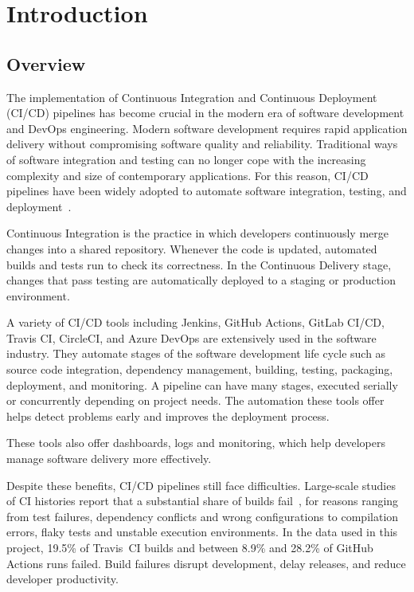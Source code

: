 \chapter{Introduction}
\label{ch:intro}

\section{Overview}
\label{sec:overview}

The implementation of Continuous Integration and Continuous Deployment (CI/CD) pipelines has become crucial in the modern era of software development and DevOps engineering. Modern software development requires rapid application delivery without compromising software quality and reliability. Traditional ways of software integration and testing can no longer cope with the increasing complexity and size of contemporary applications. For this reason, CI/CD pipelines have been widely adopted to automate software integration, testing, and deployment~\cite{hilton2016usage}.

Continuous Integration is the practice in which developers continuously merge changes into a shared repository. Whenever the code is updated, automated builds and tests run to check its correctness. In the Continuous Delivery stage, changes that pass testing are automatically deployed to a staging or production environment.

A variety of CI/CD tools including Jenkins, GitHub Actions, GitLab CI/CD, Travis CI, CircleCI, and Azure DevOps are extensively used in the software industry. They automate stages of the software development life cycle such as source code integration, dependency management, building, testing, packaging, deployment, and monitoring. A pipeline can have many stages, executed serially or concurrently depending on project needs. The automation these tools offer helps detect problems early and improves the deployment process.

These tools also offer dashboards, logs and monitoring, which help developers manage software delivery more effectively.

Despite these benefits, CI/CD pipelines still face difficulties. Large-scale studies of CI histories report that a substantial share of builds fail~\cite{rausch2017empirical,durieux2019analysis}, for reasons ranging from test failures, dependency conflicts and wrong configurations to compilation errors, flaky tests and unstable execution environments. In the data used in this project, 19.5\% of Travis~CI builds and between 8.9\% and 28.2\% of GitHub Actions runs failed. Build failures disrupt development, delay releases, and reduce developer productivity.

